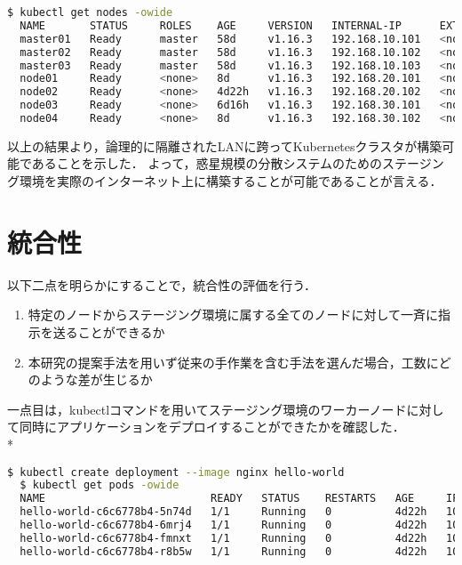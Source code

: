 \begin{lstlisting}[language=bash]
  $ kubectl get nodes -owide
  NAME       STATUS     ROLES    AGE     VERSION   INTERNAL-IP      EXTERNAL-IP   OS-IMAGE             KERNEL-VERSION      CONTAINER-RUNTIME
  master01   Ready      master   58d     v1.16.3   192.168.10.101   <none>        Ubuntu 18.04.3 LTS   4.15.0-70-generic   docker://18.9.7
  master02   Ready      master   58d     v1.16.3   192.168.10.102   <none>        Ubuntu 18.04.3 LTS   4.15.0-70-generic   docker://18.9.7
  master03   Ready      master   58d     v1.16.3   192.168.10.103   <none>        Ubuntu 18.04.3 LTS   4.15.0-70-generic   docker://18.9.7
  node01     Ready      <none>   8d      v1.16.3   192.168.20.101   <none>        Ubuntu 18.04.3 LTS   4.15.0-74-generic   docker://18.9.7
  node02     Ready      <none>   4d22h   v1.16.3   192.168.20.102   <none>        Ubuntu 18.04.3 LTS   4.15.0-74-generic   docker://18.9.7
  node03     Ready      <none>   6d16h   v1.16.3   192.168.30.101   <none>        Ubuntu 18.04.3 LTS   4.15.0-74-generic   docker://18.9.7
  node04     Ready      <none>   8d      v1.16.3   192.168.30.102   <none>        Ubuntu 18.04.3 LTS   4.15.0-74-generic   docker://18.9.7
\end{lstlisting}

以上の結果より，論理的に隔離されたLANに跨ってKubernetesクラスタが構築可能であることを示した．
よって，惑星規模の分散システムのためのステージング環境を実際のインターネット上に構築することが可能であることが言える．

\section{統合性}
\label{evaluation:method}

以下二点を明らかにすることで，統合性の評価を行う．

\begin{enumerate}
  \item 特定のノードからステージング環境に属する全てのノードに対して一斉に指示を送ることができるか
  \item 本研究の提案手法を用いず従来の手作業を含む手法を選んだ場合，工数にどのような差が生じるか
\end{enumerate}

一点目は，kubectlコマンドを用いてステージング環境のワーカーノードに対して同時にアプリケーションをデプロイすることができたかを確認した．\\*

\begin{lstlisting}[language=bash]
  $ kubectl create deployment --image nginx hello-world
  $ kubectl get pods -owide
  NAME                          READY   STATUS    RESTARTS   AGE     IP          NODE       NOMINATED NODE   READINESS GATES
  hello-world-c6c6778b4-5n74d   1/1     Running   0          4d22h   10.44.0.1   node01     <none>           <none>
  hello-world-c6c6778b4-6mrj4   1/1     Running   0          4d22h   10.42.0.1   node03     <none>           <none>
  hello-world-c6c6778b4-fmnxt   1/1     Running   0          4d22h   10.47.0.1   node02     <none>           <none>
  hello-world-c6c6778b4-r8b5w   1/1     Running   0          4d22h   10.44.0.2   node04   <none>           <none>
\end{lstlisting}

